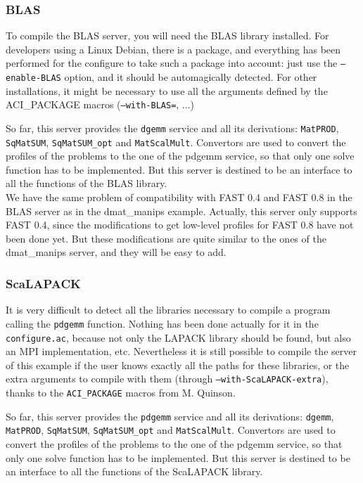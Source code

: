         \subsubsection{BLAS}

        To compile the BLAS server, you will need the BLAS library installed. For
        developers using a Linux Debian, there is a package, and everything has been
        performed for the configure to take such a package into account: just use the
        \texttt{--enable-BLAS} option, and it should be automagically detected. For
  other installations, it might be necessary to use all the arguments defined by
the ACI\_PACKAGE macros (\texttt{--with-BLAS=}, ...)

  So far, this server provides the \texttt{dgemm} service and all its derivations:
  \texttt{MatPROD}, \texttt{SqMatSUM}, \texttt{SqMatSUM\_opt} and
  \texttt{MatScalMult}. Convertors are used to convert the profiles of the
  problems to the one of the pdgemm service, so that only one solve function has
  to be implemented. But this server is destined to be an interface to all the
  functions of the BLAS library.
  \\

  We have the same problem of compatibility with FAST 0.4 and FAST 0.8 in the BLAS
  server as in the dmat\_manips example. Actually, this server only supports
  FAST 0.4, since the modifications to get low-level profiles for FAST 0.8 have not
  been done yet. But these modifications are quite similar to the ones of the
  dmat\_manips server, and they will be easy to add.

  \subsubsection{ScaLAPACK}

  It is very difficult to detect all the libraries necessary to compile a program
  calling the \texttt{pdgemm} function. Nothing has been done actually for it in
  the \texttt{configure.ac}, because not only the LAPACK library should be found,
  but also an MPI implementation, etc. Nevertheless it is still possible to
  compile the server of this example if the user knows exactly all the paths for
  these libraries, or the extra arguments to compile with them (through
      \texttt{--with-ScaLAPACK-extra}), thanks to the \texttt{ACI\_PACKAGE} macros
  from M. Quinson.

  So far, this server provides the \texttt{pdgemm} service and all its
  derivations: \texttt{dgemm}, \texttt{MatPROD}, \texttt{SqMatSUM},
  \texttt{SqMatSUM\_opt} and \texttt{MatScalMult}. Convertors are used to convert
  the profiles of the problems to the one of the pdgemm service, so that only one
  solve function has to be implemented. But this server is destined to be an
  interface to all the functions of the ScaLAPACK library.

